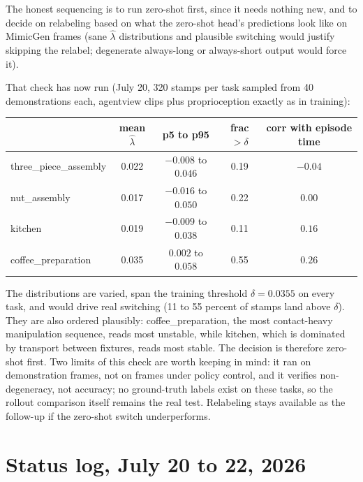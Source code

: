 \documentclass[11pt]{article}
\begin{document}
The honest sequencing is to run zero-shot first, since it needs nothing new,
and to decide on relabeling based on what the zero-shot head's predictions look
like on MimicGen frames (sane $\hat\lambda$ distributions and plausible
switching would justify skipping the relabel; degenerate always-long or
always-short output would force it).

That check has now run (July 20, 320 stamps per task sampled from 40
demonstrations each, agentview clips plus proprioception exactly as in
training):

\begin{center}
\small
\begin{tabular}{@{}lcccc@{}}
\toprule
 & mean $\hat\lambda$ & p5 to p95 & frac $> \delta$ & corr with episode time \\
\midrule
three\_piece\_assembly & 0.022 & $-0.008$ to $0.046$ & 0.19 & $-0.04$ \\
nut\_assembly          & 0.017 & $-0.016$ to $0.050$ & 0.22 & $0.00$ \\
kitchen                & 0.019 & $-0.009$ to $0.038$ & 0.11 & $0.16$ \\
coffee\_preparation    & 0.035 & $0.002$ to $0.058$  & 0.55 & $0.26$ \\
\bottomrule
\end{tabular}
\end{center}

The distributions are varied, span the training threshold $\delta = 0.0355$ on
every task, and would drive real switching (11 to 55 percent of stamps land
above $\delta$). They are also ordered plausibly: coffee\_preparation, the most
contact-heavy manipulation sequence, reads most unstable, while kitchen, which
is dominated by transport between fixtures, reads most stable. The decision is
therefore zero-shot first. Two limits of this check are worth keeping in mind:
it ran on demonstration frames, not on frames under policy control, and it
verifies non-degeneracy, not accuracy; no ground-truth labels exist on these
tasks, so the rollout comparison itself remains the real test. Relabeling
stays available as the follow-up if the zero-shot switch underperforms.

\section{Status log, July 20 to 22, 2026}
\label{sec:status}
\end{document}
